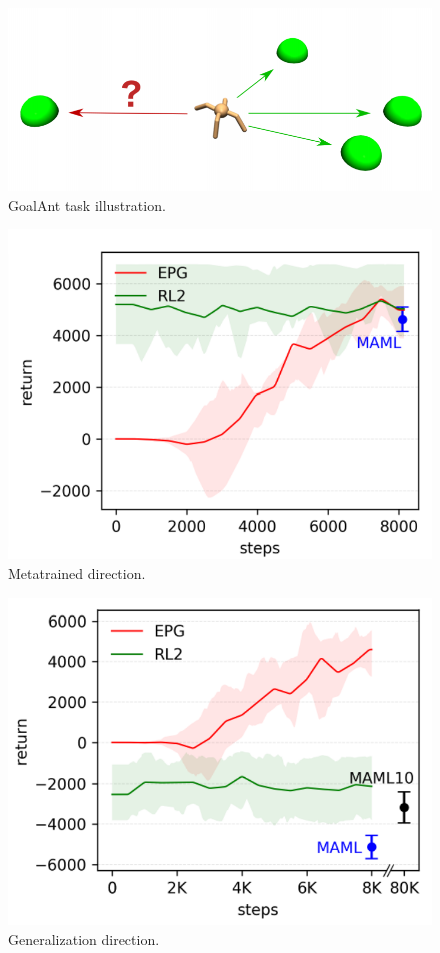 \begin{figure}
	\includegraphics[scale=0.5]{goal-ant-task.png}
	\centering
	\caption{GoalAnt task illustration.}
	\label{goal-ant}
\end{figure}
\begin{figure}
	\includegraphics[scale=0.5]{metatrained-direction.png}
	\centering
	\caption{Metatrained direction.}
	\label{metatrained-direction}
\end{figure}
\begin{figure}
	\includegraphics[scale=0.5]{generalization-direction.png}
	\centering
	\caption{Generalization direction.}
	\label{generalization-direction}
\end{figure}